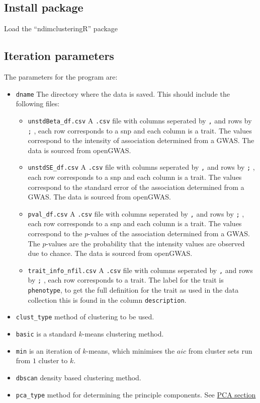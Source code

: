 \documentclass[
]{article}
\begin{document}
\hypertarget{install-package}{%
\subsection{Install package}\label{install-package}}

Load the ``ndimclusteringR'' package

\hypertarget{iteration-parameters}{%
\subsection{Iteration parameters}\label{iteration-parameters}}

The parameters for the program are:

\begin{itemize}
\item
  \texttt{dname} The directory where the data is saved. This should
  include the following files:

  \begin{itemize}
  \item
    \texttt{unstdBeta\_df.csv} A \texttt{.csv} file with columns
    seperated by \texttt{,} and rows by \texttt{;} , each row
    corresponds to a snp and each column is a trait. The values
    correspond to the intensity of association determined from a GWAS.
    The data is sourced from openGWAS.
  \item
    \texttt{unstdSE\_df.csv} A \texttt{.csv} file with columns seperated
    by \texttt{,} and rows by \texttt{;} , each row corresponds to a snp
    and each column is a trait. The values correspond to the standard
    error of the association determined from a GWAS. The data is sourced
    from openGWAS.
  \item
    \texttt{pval\_df.csv} A \texttt{.csv} file with columns seperated by
    \texttt{,} and rows by \texttt{;} , each row corresponds to a snp
    and each column is a trait. The values correspond to the
    \(p\)-values of the association determined from a GWAS. The
    \(p\)-values are the probability that the intensity values are
    observed due to chance. The data is sourced from openGWAS.
  \item
    \texttt{trait\_info\_nfil.csv} A \texttt{.csv} file with columns
    seperated by \texttt{,} and rows by \texttt{;} , each row
    corresponds to a trait. The label for the trait is
    \texttt{phenotype}, to get the full definition for the trait as used
    in the data collection this is found in the column
    \texttt{description}.
  \end{itemize}
\item
  \texttt{clust\_type} method of clustering to be used.
\item
  \texttt{basic} is a standard \(k\)-means clustering method.
\item
  \texttt{min} is an iteration of \(k\)-means, which minimises the
  \(aic\) from cluster sets run from \(1\) cluster to \(k\).
\item
  \texttt{dbscan} density based clustering method.
\item
  \texttt{pca\_type} method for determining the principle components.
  See \protect\hyperlink{pca}{PCA section}


\end{itemize}
\end{document}
